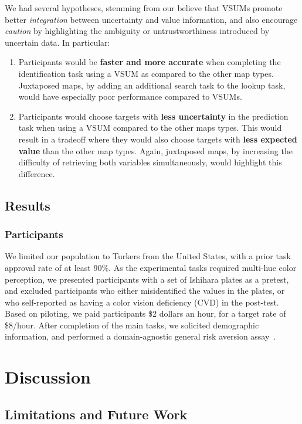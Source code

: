 \documentclass{vgtc}                          %
\begin{document}
We had several hypotheses, stemming from our believe that VSUMs promote better \emph{integration} between uncertainty and value information, and also encourage \emph{caution} by highlighting the ambiguity or untrustworthiness introduced by uncertain data. In particular:
\begin{enumerate}
	\item Participants would be \textbf{faster and more accurate} when completing the identification task using a VSUM as compared to the other map types. Juxtaposed maps, by adding an additional search task to the lookup task, would have especially poor performance compared to VSUMs.
	\item Participants would choose targets with \textbf{less uncertainty} in the prediction task when using a VSUM compared to the other maps types. This would result in a tradeoff where they would also choose targets with \textbf{less expected value} than the other map types. Again, juxtaposed maps, by increasing the difficulty of retrieving both variables simultaneously, would highlight this difference.
\end{enumerate}

\subsection{Results}

\subsubsection{Participants}

We limited our population to Turkers from the United States, with a prior task approval rate of at least 90\%. As the experimental tasks required multi-hue color perception, we presented participants with a set of Ishihara plates as a pretest, and excluded participants who either misidentified the values in the plates, or who self-reported as having a color vision deficiency (CVD) in the post-test. Based on piloting, we paid participants \$2 dollars an hour, for a target rate of \$8/hour. After completion of the main tasks, we solicited demographic information, and performed a domain-agnostic general risk aversion assay~\cite{mandrik2005exploring}.

\section{Discussion}
\subsection{Limitations and Future Work}
\end{document}
